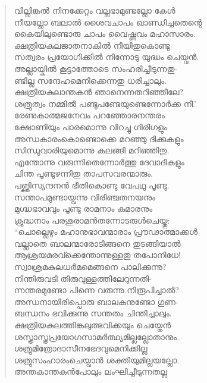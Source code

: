 \begin{verse}
വില്ലിങ്കല്‍ നിനക്കേറ്റം വല്ലഭാമുണ്ടല്ലോ കേള്‍\\
നീയല്ലോ ബലാല്‍ ശൈവചാപം ഖാണ്ഡിച്ചതെന്റെ\\
കൈയിലുണ്ടൊരു ചാപം വൈഷ്ണവം മഹാസാരം.\\
ക്ഷത്രിയകുലജാതനാകില്‍ നീയിതുകൊണ്ടു\\
സത്വരം പ്രയോഗിക്കില്‍ നിന്നോടു യുദ്ധം ചെയ്വന്‍.\\
അല്ലായ്കില്‍ കൂട്ടാത്തോടെ സംഹരിച്ചീടുന്നതു-\\
ണ്ടില്ല സന്ദേഹമെനിക്കെന്നതു ധരിച്ചാലും.\\
ക്ഷത്രിയകുലാന്തകന്‍ ഞാനെന്നതറിഞ്ഞീലേ?\\
ശത്രുത്വം നമ്മില്‍ പണ്ടുപണ്ടേയുണ്ടെന്നോര്‍ക്ക നീ.’\\
രേണുകാത്മജനേവം പറഞ്ഞോരനന്തരം\\
ക്ഷോണിയും പാരമൊന്നു വിറച്ചു ഗിരിഗളും\\
അന്ധകാരംകൊണ്ടൊക്കെ മറഞ്ഞു ദിക്കുകളും\\
സിന്ധുവാരിയുമൊന്നു കലങ്ങി മറിഞ്ഞിതു.\\
എന്തോന്നു വരുന്നിതെന്നോര്‍ത്തു ദേവാദികളും\\
ചിന്ത പൂണ്ടുഴന്നിതു താപസവരന്മാരും.\\
പങ്ക്തിസ്യന്ദനന്‍ ഭീതികൊണ്ടു വേപഥു പൂണ്ടു.\\
സന്താപമുണ്ടായ്വന്നു വിരിഞ്ചതനയനും\\
മുഗ്ദ്ധഭാവവും പൂണ്ടു രാമനാം കുമാരനും\\
ക്രുദ്ധനാം പരശുരാമന്‍തന്നോടരുള്‍ചെയ്തു:\\
“ചൊല്ലെഴും മഹാനുഭാവന്മാരാം പ്രൗഢാത്മാക്കള്‍\\
വല്ലാതെ ബാലന്മാരോടിങ്ങനെ തുടങ്ങിയാല്‍\\
ആശ്രയമരവ്‍ക്കെന്തോന്നുള്ളതു തപോനിധേ!\\
സ്വാശ്രമകുലധര്‍മമെങ്ങനെ പാലിക്കുന്നു?\\
നിന്തിരുവടി തിരുവുള്ളത്തിലേറുന്നതി-\\
ന്നന്തരമുണ്ടോ പിന്നെ വരുന്നു നിരൂപിച്ചാല്‍?\\
അന്ധനായിരിപ്പൊരു ബാലകനുണ്ടോ ഗുണ-\\
ബന്ധനം ഭവിക്കുന്നു സന്തതം ചിന്തിച്ചാലും.\\
ക്ഷത്രിയകുലത്തിങ്കലുത്ഭവിക്കയും ചെയ്തേന്‍\\
ശസ്ത്രാസ്ത്രപ്രയോഗസാമര്‍ത്ഥ്യമില്ലല്ലോതാനും.\\
ശത്രുമിത്രോദാസീനഭേദവുമെനിക്കില്ല\\
ശത്രുസംഹാരംചെയ്വാന്‍ ശക്തിയുമില്ലയല്ലോ.\\
അന്തകാന്തകന്‍പോലും ലംഘിച്ചീടുന്നതല്ല\\

\end{verse}
